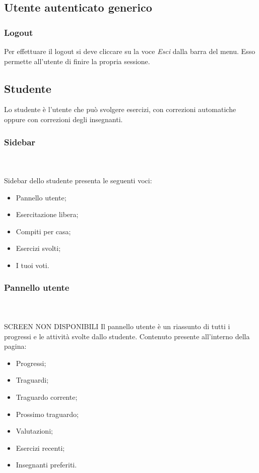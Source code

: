 \subsection{Utente autenticato generico}

    \subsubsection{Logout}
    Per effettuare il {logout} si deve cliccare su la voce \textit{Esci} dalla barra del menu. Esso permette all'utente  di finire la propria sessione.

    \subsection{Studente}
      Lo studente è l'utente che può svolgere esercizi, con correzioni automatiche oppure con correzioni degli insegnanti.
        \subsubsection{Sidebar} \mbox{}\\ \\
          Sidebar dello studente presenta le seguenti voci:
            \begin{itemize}
                \item Pannello utente;
                \item Esercitazione libera;
                \item Compiti per casa;
                \item Esercizi svolti;
                \item I tuoi voti.
            \end{itemize}
            
            
            
            
            
            
        \subsubsection{Pannello utente}\mbox{}\\ \\
          SCREEN NON DISPONIBILI
          Il pannello utente è un riassunto di tutti i progressi e le attività svolte dallo studente.
          Contenuto presente all'interno della pagina:
        	\begin{itemize}
        		\item Progressi;
        		\item Traguardi;
        		\item Traguardo corrente;
        		\item Prossimo traguardo;
        		\item Valutazioni;
        		\item Esercizi recenti;
        		\item Insegnanti preferiti.
        	\end{itemize}
        

